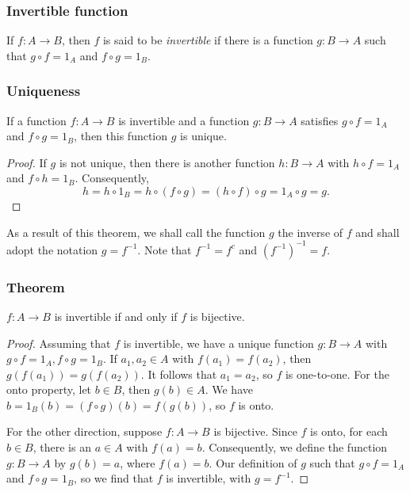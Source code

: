 \documentclass[11pt]{article}
\begin{document}
    \subsubsection{Invertible function}

    If \(f:A \rightarrow B\), then $f$ is said to be \emph{invertible} if there is a function \(g: B \rightarrow A\) such that \(g \circ f = 1_A\) and \(f \circ g = 1_B.\)

    \subsubsection{Uniqueness}

    If a function \(f: A \rightarrow B\) is invertible and a function \(g:B \rightarrow A\) satisfies \(g \circ f = 1_A\) and \(f \circ g = 1_B\), then this function $g$ is unique.

    \begin{proof}
        If $g$ is not unique, then there is another function \(h: B \rightarrow A\) with \(h \circ f = 1_A\) and \(f \circ h = 1_B \). Consequently, \[h = h \circ 1_B = h \circ (f \circ g) = (h \circ f) \circ g = 1_A \circ g = g.\]
    \end{proof}

    As a result of this theorem, we shall call the function $g$ the inverse of $f$ and shall adopt the notation \(g = f^{-1}\). Note that \(f^{-1} = f^c\) and \((f^{-1})^{-1} = f.\)

    \subsubsection{Theorem}

    \(f: A \rightarrow B\) is invertible if and only if $f$ is bijective. 
    \begin{proof}
        Assuming that $f$ is invertible, we have a unique function \(g:B \rightarrow A\) with \(g \circ f = 1_A, f \circ g = 1_B\). If \(a_1,a_2 \in A\) with \(f(a_1) = f(a_2)\), then \(g(f(a_1)) = g(f(a_2))\). It follows that \(a_1 = a_2\), so $f$ is one-to-one. For the onto property, let \(b \in B\), then \(g(b) \in A\). We have \(b = 1_B (b) = (f \circ g)(b) = f(g(b))\), so $f$ is onto.

        \vspace{1em}

        For the other direction, suppose \(f: A \rightarrow B\) is bijective. Since $f$ is onto, for each \(b \in B\), there is an  \(a \in A\) with \(f(a) = b.\) Consequently, we define the function \(g: B \rightarrow A\) by \(g(b) = a\), where \(f(a) = b\). Our definition of $g$ such that \(g \circ f = 1_A\) and \(f \circ g = 1_B\), so we find that $f$ is invertible, with \(g = f^{-1}\).
    \end{proof}
\end{document}

